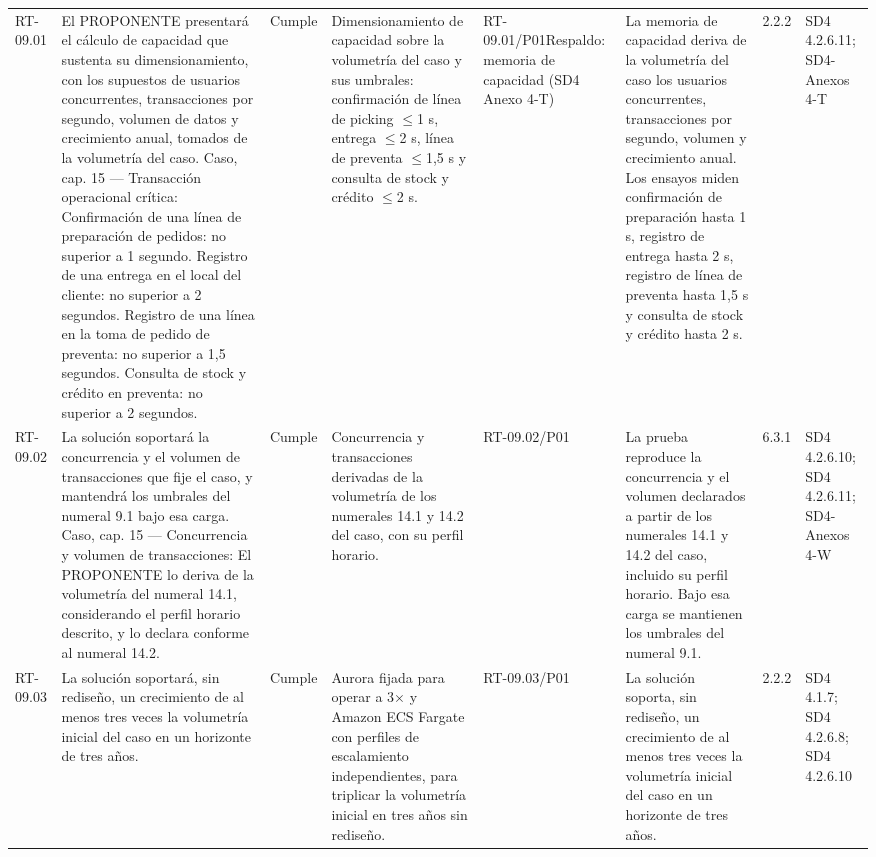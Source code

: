 \documentclass[oficio,firma,final]{lafrox}
\begin{document}
\begin{landscape}
{\begin{longtable}{@{}F{0.054} F{0.173} F{0.061} F{0.191} F{0.106} F{0.180} F{0.067} F{0.168}@{}}
  RT-09.01 & El PROPONENTE presentará el cálculo de capacidad que sustenta su dimensionamiento, con los supuestos de usuarios concurrentes, transacciones por segundo, volumen de datos y crecimiento anual, tomados de la volumetría del caso. Caso, cap. 15 — Transacción operacional crítica: Confirmación de una línea de preparación de pedidos: no superior a 1 segundo. Registro de una entrega en el local del cliente: no superior a 2 segundos. Registro de una línea en la toma de pedido de preventa: no superior a 1,5 segundos. Consulta de stock y crédito en preventa: no superior a 2 segundos. & Cumple & Dimensionamiento de capacidad sobre la volumetría del caso y sus umbrales: confirmación de línea de picking $\leq$1 s, entrega $\leq$2 s, línea de preventa $\leq$1,5 s y consulta de stock y crédito $\leq$2 s. & RT-09.01/\allowbreak{}P01\newline Respaldo: memoria de capacidad (SD4 Anexo 4-T) & La memoria de capacidad deriva de la volumetría del caso los usuarios concurrentes, transacciones por segundo, volumen y crecimiento anual. Los ensayos miden confirmación de preparación hasta 1 s, registro de entrega hasta 2 s, registro de línea de preventa hasta 1,5 s y consulta de stock y crédito hasta 2 s. & 2.2.2 & SD4 4.2.6.11; SD4-Anexos 4-T  \\
  RT-09.02 & La solución soportará la concurrencia y el volumen de transacciones que fije el caso, y mantendrá los umbrales del numeral 9.1 bajo esa carga. Caso, cap. 15 — Concurrencia y volumen de transacciones: El PROPONENTE lo deriva de la volumetría del numeral 14.1, considerando el perfil horario descrito, y lo declara conforme al numeral 14.2. & Cumple & Concurrencia y transacciones derivadas de la volumetría de los numerales 14.1 y 14.2 del caso, con su perfil horario. & RT-09.02/\allowbreak{}P01 & La prueba reproduce la concurrencia y el volumen declarados a partir de los numerales 14.1 y 14.2 del caso, incluido su perfil horario. Bajo esa carga se mantienen los umbrales del numeral 9.1. & 6.3.1 & SD4 4.2.6.10; SD4 4.2.6.11; SD4-Anexos 4-W  \\
  RT-09.03 & La solución soportará, sin rediseño, un crecimiento de al menos tres veces la volumetría inicial del caso en un horizonte de tres años. & Cumple & Aurora fijada para operar a 3$\times$ y Amazon ECS Fargate con perfiles de escalamiento independientes, para triplicar la volumetría inicial en tres años sin rediseño. & RT-09.03/\allowbreak{}P01 & La solución soporta, sin rediseño, un crecimiento de al menos tres veces la volumetría inicial del caso en un horizonte de tres años. & 2.2.2 & SD4 4.1.7; SD4 4.2.6.8; SD4 4.2.6.10  \\

\end{longtable}}
\end{landscape}
\end{document}
